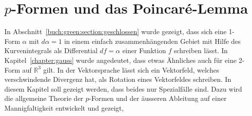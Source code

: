 %
%
%
\chapter{$p$-Formen und das Poincaré-Lemma
\label{chapter:pformen}}

\noindent
In Abschnitt~\ref{buch:green:section:geschlossen} wurde gezeigt,
dass sich eine 1-Form $\alpha$ mit $d\alpha=1$ in einem einfach
zusammenhängenden Gebiet mit Hilfe des Kurvenintegrals als Differential
$df=\alpha$ einer Funktion $f$ schreiben lässt.
In Kapitel~\ref{chapter:gauss} wurde angedeutet, dass etwas Ähnliches auch
für eine 2-Form auf $\mathbb{R}^3$ gilt.
In der Vektorsprache lässt sich ein Vektorfeld, welches verschwindende
Divergenz hat, als Rotation eines Vektorfeldes schreiben.
In diesem Kapitel soll gezeigt werden, dass beides nur Spezialfälle sind.
Dazu wird die allgemeine Theorie der $p$-Formen und der äusseren Ableitung
auf einer Mannigfaltigkeit entwickelt und gezeigt, 






